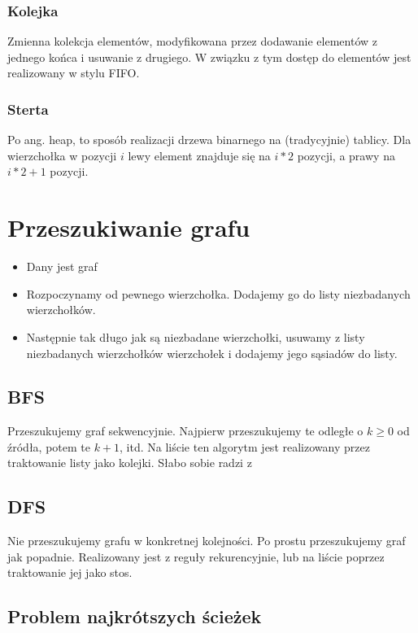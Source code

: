 \documentclass{../notatki}
\begin{document}
\subsubsection{Kolejka}

Zmienna kolekcja elementów, modyfikowana przez dodawanie
elementów z jednego
końca i usuwanie z drugiego. W związku z tym dostęp do elementów jest
realizowany
w stylu FIFO.

\subsubsection{Sterta}

Po ang. heap, to sposób realizacji drzewa binarnego na (tradycyjnie) tablicy.
Dla wierzchołka w pozycji $i$ lewy element znajduje się na $i * 2$ pozycji, a
prawy na $i * 2 + 1$ pozycji.

\section{Przeszukiwanie grafu}

\begin{itemize}
  \item Dany jest graf
  \item Rozpoczynamy od pewnego wierzchołka. Dodajemy go do listy niezbadanych
    wierzchołków.
  \item Następnie tak długo jak są niezbadane wierzchołki, usuwamy z
    listy niezbadanych wierzchołków wierzchołek i dodajemy jego
    sąsiadów do listy.
\end{itemize}

\subsection{BFS}

Przeszukujemy graf sekwencyjnie. Najpierw przeszukujemy te odległe o $k \ge 0$
od źródła, potem te $k + 1$, itd. Na liście ten algorytm jest realizowany przez
traktowanie listy jako kolejki. Słabo sobie radzi z

\subsection{DFS}

Nie przeszukujemy grafu w konkretnej kolejności. Po prostu przeszukujemy graf
jak popadnie. Realizowany jest z reguły rekurencyjnie, lub na liście
poprzez traktowanie
jej jako stos.

\subsection{Problem najkrótszych ścieżek}
\end{document}
